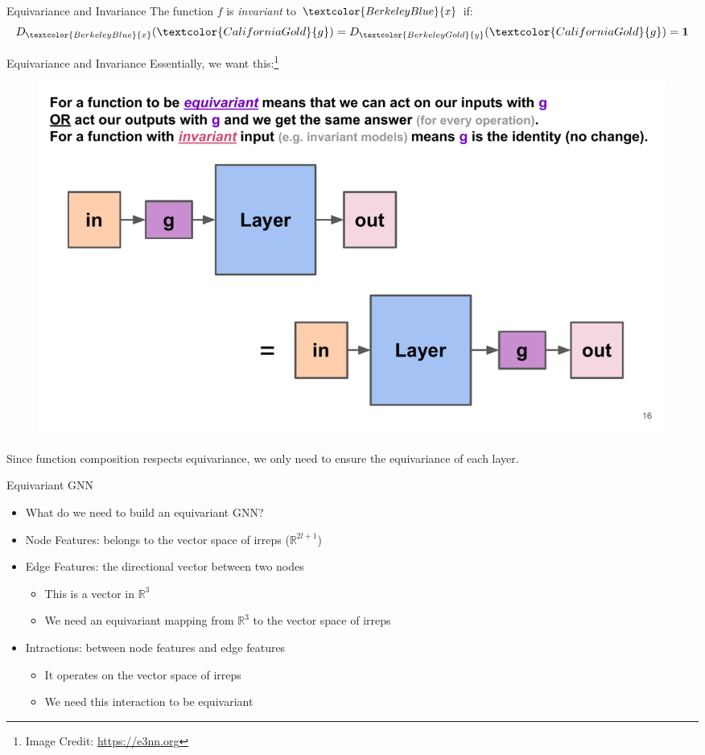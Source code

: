 \documentclass[pdf,serif]{beamer}
\newcommand{\empr}[1]{{\color{BerkeleyBlue}\emph{#1}}}
\begin{document}
\begin{frame}{Equivariance and Invariance}
    The function $f$ is \empr{invariant} to $\textcolor{BerkeleyBlue}{x}$ if:
    $$\scalebox{1.1}{$D_{\textcolor{BerkeleyBlue}{x}}(\textcolor{CaliforniaGold}{g}) = D_{\textcolor{BerkeleyGold}{y}}(\textcolor{CaliforniaGold}{g}) = \mathbf{1}$}$$
\end{frame}

\begin{frame}{Equivariance and Invariance}
    Essentially, we want this:\footnote[frame]{Image Credit: \url{https://e3nn.org}}
    \begin{figure}
        \includegraphics[width=\linewidth]{images/equnn}
    \end{figure}
    Since function composition respects equivariance, we only need to ensure the equivariance of each layer.
\end{frame}

\begin{frame}{Equivariant GNN}
    \begin{itemize}
        \item What do we need to build an equivariant GNN?
        \item Node Features: belongs to the vector space of irreps ($\mathbb R^{2l+1}$)
        \item Edge Features: the directional vector between two nodes
        \begin{itemize}
            \item This is a vector in $\mathbb R^3$
            \item We need an equivariant mapping from $\mathbb R^3$ to the vector space of irreps
        \end{itemize}
        \item Intractions: between node features and edge features
        \begin{itemize}
            \item It operates on the vector space of irreps
            \item We need this interaction to be equivariant
        \end{itemize}
    \end{itemize}
\end{frame}
\end{document}
